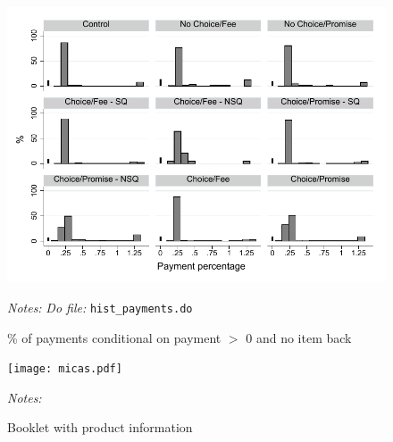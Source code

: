 \documentclass[11pt]{article}
\begin{document}
\begin{figure}[H]
        \caption{\% of payments conditional on payment $>$ 0 and no item back}
    \label{HistPayments_pos}
    \begin{center}
        \centering
        \includegraphics[width=\textwidth]{Figuras/hist_perc_payment_conditional.pdf}
    \end{center}
     \footnotesize \textit{Notes: } 
      \footnotesize{ \textit{Do file: }  \texttt{hist\_payments.do}}
\end{figure}


\begin{figure}[H]
        \caption{Booklet with product information}
    \label{micas}
    \begin{center}
        \centering
        \texttt{[image: micas.pdf]}
    \end{center}
     \footnotesize \textit{Notes: } 
      \footnotesize{ }
\end{figure}
\end{document}

